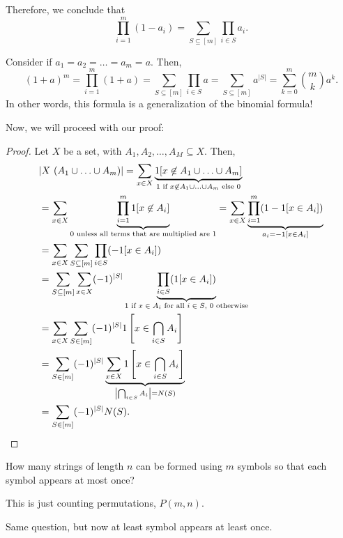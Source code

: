 Therefore, we conclude that \[
	\prod_{i=1}^{m} (1-a_{i}) = \sum_{S \subseteq [m]} \prod_{i \in S} a_{i}
.\] 

\begin{eg}
	Consider if \( a_{1}=a_{2}=\ldots =a_m=a \). Then, \[
		(1+a)^m = \prod_{i=1}^{m}(1+a) = \sum_{S \subseteq [m]} \prod_{i \in S} a = \sum_{S \subseteq [m]} a^{|S|}  = \sum_{k=0}^{m} \binom{m}{k} a^{k}
	.\] In other words, this formula is a generalization of the binomial formula!
\end{eg}

Now, we will proceed with our proof:

\begin{proof}
	Let \( X \) be a set, with \( A_{1},A_{2},\ldots ,A_M \subseteq X \). Then, 
	\begin{align*}
		&|X \ (A_{1}\cup \ldots \cup A_m)| = \sum_{x \in X} \underbrace{1[x \not\in A_{1}\cup \ldots \cup A_m]}_{1 \text{ if } x \not\in  A_{1}\cup \ldots \cup A_m \text{ else } 0}\\
		&= \sum_{x \in X} \underbrace{\prod_{i=1}^{m} 1[x \not\in A_{i}]}_{\text{0 unless all terms that are multiplied are 1}} = \sum_{x \in X} \underbrace{\prod_{i=1}^{m}(1-1[x \in A_{i}])}_{a_i=-1[x \in A_i]}\\
		&= \sum_{x \in X} \sum_{S \subseteq [m]} \prod_{i \in S} (-1[x \in A_{i}]) \\
		&= \sum_{S \subseteq [m]} \sum_{x \in X} (-1)^{|S|} \underbrace{\prod_{i \in S} (1[x \in A_{i}])}_{\text{1 if \( x \in A_i \) for all \( i \in S \), 0 otherwise}}\\
		&= \sum_{x \in X} \sum_{S \in [m]} (-1)^{|S|} 1\left[x \in \bigcap_{i \in S} A_i\right] \\
		&= \sum_{S \in [m]} (-1)^{|S|} \underbrace{\sum_{x \in X} 1\left[x \in \bigcap_{i \in S} A_i\right]}_{\left|\bigcap_{i \in S}A_i \right| = N(S)} \\
		&= \sum_{S \in [m]} (-1)^{|S|} N(S)
	.\end{align*}
\end{proof}

\begin{eg}
	How many strings of length \( n \) can be formed using \( m \) symbols so that each symbol appears at most once?
\end{eg}

This is just counting permutations, \( P(m,n) \).

Same question, but now at least symbol appears at least once.
